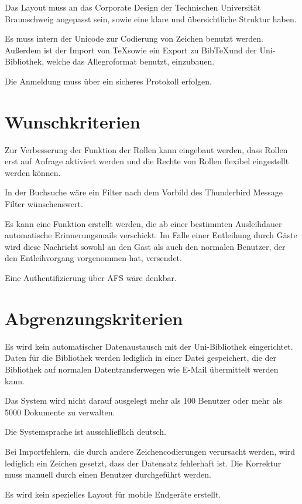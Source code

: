 Das Layout muss an das Corporate Design der Technischen Universität Braunschweig angepasst sein, sowie eine klare und übersichtliche Struktur haben. 

Es muss intern der Unicode zur Codierung von Zeichen benutzt werden. Außerdem ist der Import von \TeX sowie ein Export zu Bib\TeX und der Uni-Bibliothek, welche das Allegroformat benutzt, einzubauen. 

Die Anmeldung muss über ein sicheres Protokoll erfolgen.

\section{Wunschkriterien}
Zur Verbesserung der Funktion der Rollen kann eingebaut werden, dass Rollen erst auf Anfrage aktiviert werden und die Rechte von Rollen flexibel eingestellt werden können. 

In der Buchsuche wäre ein Filter nach dem Vorbild des Thunderbird Message Filter wünschenswert. 

Es kann eine Funktion erstellt werden, die ab einer bestimmten Ausleihdauer automatische Erinnerungsmails verschickt. Im Falle einer Entleihung durch Gäste wird diese Nachricht sowohl an den Gast als auch den normalen Benutzer, der den Entleihvorgang vorgenommen hat, versendet. 

Eine Authentifizierung über AFS wäre denkbar.

\section{Abgrenzungskriterien}
Es wird kein automatischer Datenaustausch mit der Uni-Bibliothek eingerichtet. Daten für die Bibliothek werden lediglich in einer Datei gespeichert, die der Bibliothek auf normalen Datentransferwegen wie E-Mail übermittelt werden kann. 

Das System wird nicht darauf ausgelegt mehr als 100 Benutzer oder mehr als 5000 Dokumente zu verwalten.

Die Systemsprache ist ausschließlich deutsch.

Bei Importfehlern, die durch andere Zeichencodierungen verursacht werden, wird lediglich ein Zeichen gesetzt, dass der Datensatz fehlerhaft ist. Die Korrektur muss manuell durch einen Benutzer durchgeführt werden.

Es wird kein spezielles Layout für mobile Endgeräte erstellt.